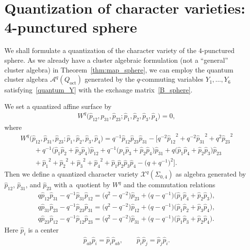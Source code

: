 \documentclass[10pt,a4paper]{amsart}
\numberwithin{equation}{section}
\begin{document}
\section{Quantization of character varieties: 4-punctured sphere}\label{sec:q_sphere}

We shall formulate a quantization of the character variety of the $4$-punctured sphere. As we already have a cluster algebraic formulation (not a ``general'' cluster algebra) in Theorem~\ref{thm:map_sphere}, we can employ
the quantum cluster algebra $\mathcal{A}^q(Q_{\text{oct}})$ generated by the $q$-commuting variables $Y_1,\dots,Y_6$ satisfying~\eqref{quantum_Y} with the exchange matrix~\eqref{B_sphere}.

We set a quantized affine surface by
\begin{gather} \label{qW_is_zero}
 W^q \big( \hat{p}_{12}, \hat{p}_{31}, \hat{p}_{23}; \hat{p}_1, \hat{p}_2, \hat{p}_3, \hat{p}_4 \big) = 0,
\end{gather}
where
\begin{gather}
 W^q \big( \hat{p}_{12}, \hat{p}_{31}, \hat{p}_{23}; \hat{p}_1, \hat{p}_2, \hat{p}_3, \hat{p}_4 \big) = q^{-1} \hat{p}_{12} \hat{p}_{23} \hat{p}_{31} - \bigl[ q^{-2} {\hat{p}_{12}}^{2} + q^{-2} {\hat{p}_{31}}^{2}
 + q^2 {\hat{p}_{23}}^{2} \nonumber\\
 \qquad {} +q^{-1} \big( \hat{p}_1 \hat{p}_2 + \hat{p}_3 \hat{p}_4 \big) \hat{p}_{12} +q^{-1} \big( \hat{p}_1 \hat{p}_3 + \hat{p}_2 \hat{p}_4 \big) \hat{p}_{31} +q \big( \hat{p}_1 \hat{p}_4 + \hat{p}_2 \hat{p}_3 \big)
 \hat{p}_{23}\nonumber \\
 \qquad{} + {\hat{p}_1}^{2} + {\hat{p}_2}^{2}+ {\hat{p}_3}^{2} + {\hat{p}_4}^{2} + \hat{p}_1 \hat{p}_2 \hat{p}_3 \hat{p}_4 -\big( q+q^{-1} \big)^2 \bigr]. \label{center_x_b}
\end{gather}
Then we define a quantized character variety $\mathcal{X}^q(\Sigma_{0,4})$ as algebra generated by $\hat{p}_{12}$, $\hat{p}_{31}$, and $\hat{p}_{23}$ with a~quotient by $W^q$ and the commutation relations
\begin{gather}
 q \hat{p}_{12} \hat{p}_{31} - q^{-1} \hat{p}_{31} \hat{p}_{12} = \big(q^2-q^{-2}\big) \hat{p}_{23} + \big(q-q^{-1}\big) \big( \hat{p}_1 \hat{p}_4 + \hat{p}_2 \hat{p}_3 \big) ,\nonumber \\
q \hat{p}_{31} \hat{p}_{23} - q^{-1} \hat{p}_{23} \hat{p}_{31} = \big(q^2-q^{-2}\big) \hat{p}_{12} + \big(q-q^{-1}\big) \big( \hat{p}_1 \hat{p}_2 + \hat{p}_3 \hat{p}_4 \big) ,\nonumber \\
 q \hat{p}_{23} \hat{p}_{12} - q^{-1} \hat{p}_{12} \hat{p}_{23} = \big(q^2-q^{-2}\big) \hat{p}_{31} + \big(q-q^{-1}\big) \big( \hat{p}_1 \hat{p}_3 + \hat{p}_2 \hat{p}_4 \big) .\label{quantum_x_b}
\end{gather}
Here $\hat{p}_i$ is a center
\begin{gather*}
 \hat{p}_{ab} \hat{p}_i = \hat{p}_i \hat{p}_{ab}, \qquad \hat{p}_i \hat{p}_j = \hat{p}_j \hat{p}_i .
\end{gather*}
\end{document}
